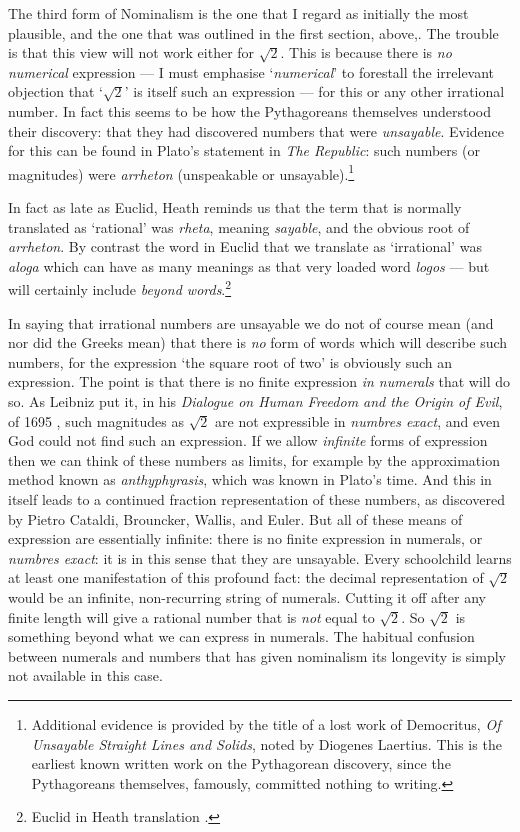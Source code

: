 \documentclass[11pt,oneside,a4paper]{article}
\newcommand*{\sqrtwo}{\ensuremath{\sqrt{2}}\hspace{0.5ex}\xspace}
\newcommand{\name}[1]{\hspace{0.5ex}`\textit{#1}\hspace{0.45ex}'\hspace{0.55ex}\xspace}
\begin{document}
The third form of Nominalism is the one that I regard as initially the most plausible, and the one that was outlined in the first section, above,. The trouble is that this view will not work either for \sqrtwo. This is because there is \textit{no} \textit{numerical} expression --- I must emphasise \name{numerical} to forestall the irrelevant objection that `\sqrtwo' is itself such an expression --- for this or any other irrational number. In fact this seems to be how the Pythagoreans themselves understood their discovery: that they had discovered numbers that were \textit{unsayable}. Evidence for this can be found in Plato's statement in \textit{The Republic}: such numbers (or magnitudes) were \textit{arrheton} (unspeakable or unsayable).\footnote{Additional evidence is provided by the title of a lost work of Democritus, \textit{Of Unsayable Straight Lines and Solids}, noted by Diogenes Laertius. This is the earliest known written work on the Pythagorean discovery, since the Pythagoreans themselves, famously, committed nothing to writing.}


In fact as late as Euclid, Heath reminds us that the term that is normally translated as `rational' was \emph{rheta}, meaning \textit{sayable}, and the obvious root of \textit{arrheton}. By contrast the word in Euclid that we translate as `irrational' was \emph{aloga} which can have as many meanings as that very loaded word \textit{logos} --- but will certainly include \textit{beyond words}.\footnote{Euclid in Heath translation \parencite{euclid_thirteen_1956}.}

In saying that irrational numbers are unsayable we do not of course mean (and nor did the Greeks mean) that there is \textit{no} form of words which will describe such numbers, for the expression `the square root of two' is obviously such an expression. The point is that there is no finite expression \textit{in numerals} that will do so. As Leibniz put it, in his \textit{Dialogue on Human Freedom and the Origin of Evil}, of 1695 \parencite{leibniz_dialogue_1989}, such magnitudes as \sqrtwo are not expressible in \textit{numbres exact}, and even God could not find such an expression. If we allow \textit{infinite} forms of expression then we can think of these numbers as limits, for example by the approximation method known as \textit{anthyphyrasis}, which was known in Plato's time. And this in itself leads to a continued fraction representation of these numbers, as discovered by Pietro Cataldi, Brouncker, Wallis, and Euler. But all of these means of expression are essentially infinite: there is no finite expression in numerals, or \textit{numbres exact}: it is in this sense that they are unsayable. Every schoolchild learns at least one manifestation of this profound fact: the decimal representation of \sqrtwo would be an infinite, non-recurring string of numerals. Cutting it off after any finite length will give a rational number that is \textit{not} equal to \sqrtwo. So \sqrtwo is something beyond what we can express in numerals. The habitual confusion between numerals and numbers that has given nominalism its longevity is simply not available in this case.
\end{document}

